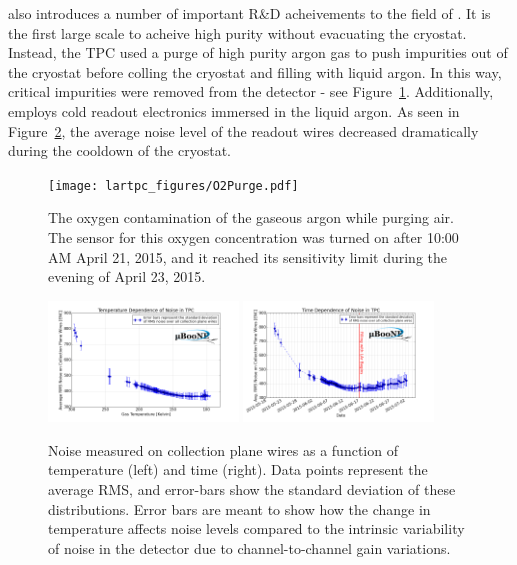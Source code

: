 \uboone also introduces a number of important R\&D acheivements to the field of \lartpcs.  It is the first large scale \lartpc to acheive high purity without evacuating the cryostat.  Instead, the TPC used a purge of high purity argon gas to push impurities out of the cryostat before colling the cryostat and filling with liquid argon.   In this way, critical impurities were removed from the detector - see Figure~\ref{fig:o2purge}.  Additionally, \uboone employs cold readout electronics immersed in the liquid argon.  As seen in Figure~\ref{fig:noise_vs_temp}, the average noise level of the readout wires decreased dramatically during the cooldown of the \uboone cryostat.

\begin{figure}[htb]
  \centering
  \texttt{[image: lartpc\_figures/O2Purge.pdf]}
  \caption[\uboone O2 Contamination]{The oxygen contamination of the gaseous argon while purging air. The sensor for this oxygen concentration was turned on after 10:00 AM April 21, 2015, and it reached its sensitivity limit during the evening of April 23, 2015. \cite{uboone_pub_1003}}
  \label{fig:o2purge}
\end{figure}


\begin{figure}[htb]
  \centering
  \includegraphics[width=0.45\textwidth]{lartpc_figures/noise_vs_temp.png}
  \includegraphics[width=0.45\textwidth]{lartpc_figures/noise_vs_time.png}
  \caption[\uboone Noise Temperature Dependence]{Noise measured on collection plane wires as a function of temperature (left) and time (right).  Data points represent the average RMS, and error-bars show the standard deviation of these distributions. Error bars are meant to show how the change in temperature affects noise levels compared to the intrinsic variability of noise in the detector due to channel-to-channel gain variations. \cite{uboone_pub_1001} }
  \label{fig:noise_vs_temp}
\end{figure}

